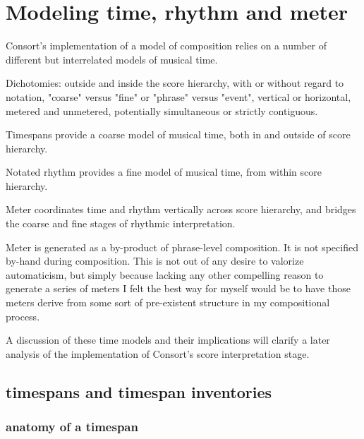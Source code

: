 \chapter{Modeling time, rhythm and meter}

\begin{comment}
<abjad>[hide=true]
import consort
</abjad>
\end{comment}

Consort's implementation of a model of composition relies on a number of
different but interrelated models of musical time.

Dichotomies: outside and inside the score hierarchy, with or without regard to
notation, "coarse" versus "fine" or "phrase" versus "event", vertical or
horizontal, metered and unmetered, potentially simultaneous or strictly
contiguous.

Timespans provide a coarse model of musical time, both in and outside of score
hierarchy.

Notated rhythm provides a fine model of musical time, from within score
hierarchy.

Meter coordinates time and rhythm vertically across score hierarchy, and
bridges the coarse and fine stages of rhythmic interpretation.

Meter is generated as a by-product of phrase-level composition. It is not
specified by-hand during composition. This is not out of any desire to valorize
automaticism, but simply because lacking any other compelling reason to
generate a series of meters I felt the best way for myself would be to have
those meters derive from some sort of pre-existent structure in my
compositional process.

A discussion of these time models and their implications will clarify a later
analysis of the implementation of Consort's score interpretation
stage.

\section{timespans and timespan inventories}

\subsection{anatomy of a timespan}

\begin{comment}
<abjad>
timespan = timespantools.Timespan(
    start_offset=Offset(1, 4),
    stop_offset=Offset(3, 2),
    )
</abjad>
\end{comment}

